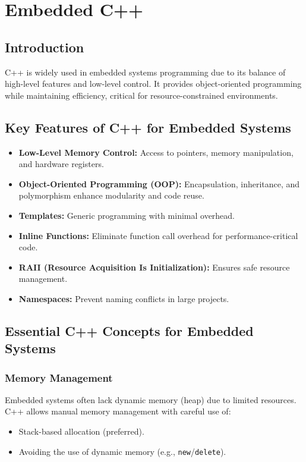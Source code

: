 \chapter{Embedded C++}

\section*{Introduction}
C++ is widely used in embedded systems programming due to its balance of high-level features and low-level control. It provides object-oriented programming while maintaining efficiency, critical for resource-constrained environments.

\section{Key Features of C++ for Embedded Systems}
\begin{itemize}
    \item \textbf{Low-Level Memory Control:} Access to pointers, memory manipulation, and hardware registers.
    \item \textbf{Object-Oriented Programming (OOP):} Encapsulation, inheritance, and polymorphism enhance modularity and code reuse.
    \item \textbf{Templates:} Generic programming with minimal overhead.
    \item \textbf{Inline Functions:} Eliminate function call overhead for performance-critical code.
    \item \textbf{RAII (Resource Acquisition Is Initialization):} Ensures safe resource management.
    \item \textbf{Namespaces:} Prevent naming conflicts in large projects.
\end{itemize}

\section{Essential C++ Concepts for Embedded Systems}
\subsection{Memory Management}
Embedded systems often lack dynamic memory (heap) due to limited resources. C++ allows manual memory management with careful use of:
\begin{itemize}
    \item Stack-based allocation (preferred).
    \item Avoiding the use of dynamic memory (e.g., \texttt{new}/\texttt{delete}).
\end{itemize}

